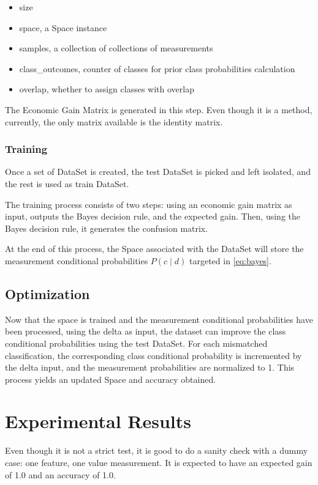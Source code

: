 \documentclass[letterpaper, conference]{IEEEtran}
\begin{document}
\begin{itemize}
\item size
\item space, a Space instance
\item samples, a collection of collections of measurements
\item class\_outcomes, counter of classes for prior class probabilities calculation
\item overlap, whether to assign classes with overlap
\end{itemize}

The Economic Gain Matrix is generated in this step. Even though it is a method, currently, the only matrix available is the identity matrix.

\subsubsection{Training}

Once a set of DataSet is created, the test DataSet is picked and left isolated, and the rest is used as train DataSet.

The training process consists of two steps: using an economic gain matrix as input, outputs the Bayes decision rule, and the expected gain. Then, using the Bayes decision rule, it generates the confusion matrix.


At the end of this process, the Space associated with the DataSet will store the measurement conditional probabilities $P(c \mid d)$ targeted in \ref{eq:bayes}.

\subsection{Optimization}

Now that the space is trained and the measurement conditional probabilities have been processed, using the delta as input, the dataset can improve the class conditional probabilities using the test DataSet. For each mismatched classification, the corresponding class conditional probability is incremented by the delta input, and the measurement probabilities are normalized to 1. This process yields an updated Space and accuracy obtained.

\section{Experimental Results}

Even though it is not a strict test, it is good to do a sanity check with a dummy case: one feature, one value measurement. It is expected to have an expected gain of 1.0 and an accuracy of 1.0.
\end{document}
